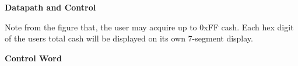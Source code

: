 \begin{enumerate}
\begin{solution}
{%
 
{\bf Datapath and Control}

\begin{figure}[ht]
\end{figure}

Note from the figure that, the user may acquire
up to 0xFF cash.  Each hex digit of the users total cash will 
be displayed on its own 7-segment display.

{\bf Control Word}

}
\end{solution}
\end{enumerate}
